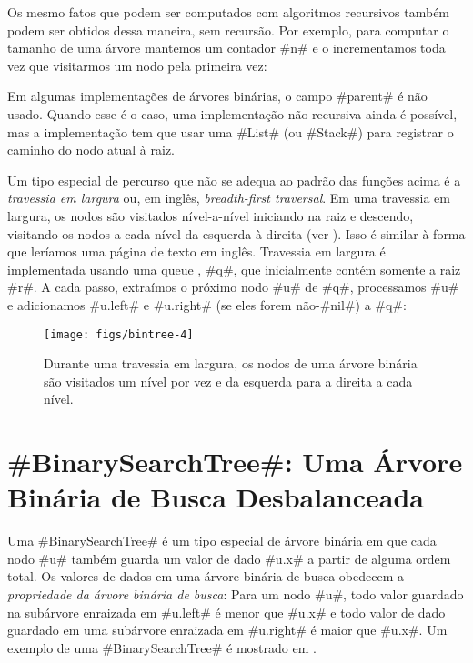 Os mesmo fatos que podem ser computados com algoritmos recursivos também podem
ser obtidos dessa maneira, sem recursão. Por exemplo, para computar o tamanho 
de uma árvore mantemos um contador #n# e o incrementamos toda vez que visitarmos um nodo pela primeira vez:

Em algumas implementações de árvores binárias, o campo #parent# é não usado.
Quando esse é o caso, uma implementação não recursiva ainda é possível,
mas a implementação tem que usar uma 
#List# (ou #Stack#) para registrar o caminho do nodo atual à raiz.

Um tipo especial de percurso que não se adequa ao padrão das funções acima é a
\emph{travessia em largura} ou, em inglês, \emph{breadth-first traversal}.
%
%
Em uma travessia em largura, os nodos são visitados nível-a-nível iniciando na raiz e descendo, visitando os nodos a cada nível da esquerda à direita (ver
). Isso é similar à forma que leríamos uma página de texto em inglês. Travessia em largura é implementada usando uma queue 
, #q#, que inicialmente contém somente a raiz #r#. A cada passo, 
extraímos o próximo nodo #u# de #q#, processamos #u# e adicionamos #u.left#
e #u.right# (se eles forem não-#nil#) a #q#:

\begin{figure}
  \begin{center}
    \texttt{[image: figs/bintree-4]}
  \end{center}
  \caption{Durante uma travessia em largura, os nodos de uma árvore binária são visitados um nível por vez e da esquerda para a direita a cada nível.}
\end{figure}


\section{#BinarySearchTree#: Uma Árvore Binária de Busca Desbalanceada} 

%
%
%
Uma 
#BinarySearchTree# é um tipo especial de árvore binária em que cada nodo #u# também guarda um valor de dado #u.x# a partir de alguma ordem total.
Os valores de dados em uma árvore binária de busca obedecem a \emph{propriedade da árvore binária de busca}:
%
Para um nodo #u#, todo valor guardado na subárvore enraizada em #u.left#
é menor que #u.x# e todo valor de dado guardado em uma subárvore enraizada 
em #u.right# é maior que #u.x#. Um exemplo de uma
 #BinarySearchTree# é mostrado em .

